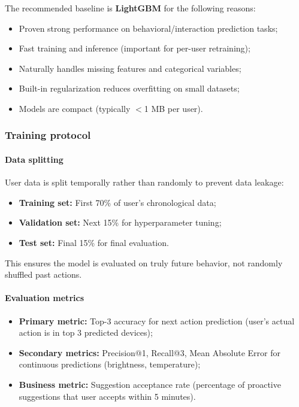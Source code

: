 The recommended baseline is \textbf{LightGBM} for the following reasons:
\begin{itemize}
    \item Proven strong performance on behavioral/interaction prediction tasks;
    \item Fast training and inference (important for per-user retraining);
    \item Naturally handles missing features and categorical variables;
    \item Built-in regularization reduces overfitting on small datasets;
    \item Models are compact (typically $<$1 MB per user).
\end{itemize}

\subsubsection{Training protocol}

\paragraph{Data splitting}
User data is split temporally rather than randomly to prevent data
leakage:
\begin{itemize}
    \item \textbf{Training set:} First 70\% of user's chronological data;
    \item \textbf{Validation set:} Next 15\% for hyperparameter tuning;
    \item \textbf{Test set:} Final 15\% for final evaluation.
\end{itemize}

This ensures the model is evaluated on truly future behavior, not
randomly shuffled past actions.

\paragraph{Evaluation metrics}
\begin{itemize}
    \item \textbf{Primary metric:} Top-3 accuracy for next action prediction
    (user's actual action is in top 3 predicted devices);
    \item \textbf{Secondary metrics:} Precision@1, Recall@3, Mean Absolute
    Error for continuous predictions (brightness, temperature);
    \item \textbf{Business metric:} Suggestion acceptance rate (percentage
    of proactive suggestions that user accepts within 5 minutes).
\end{itemize}


